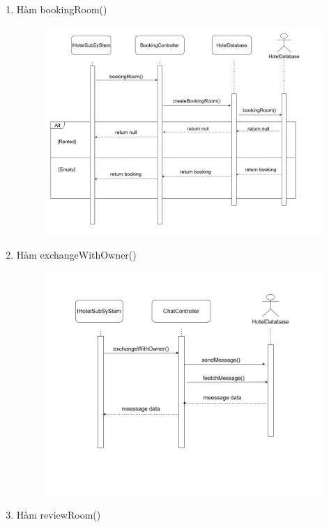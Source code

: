 \begin{enumerate}
\begin{figure}[H]
        \end{figure}
        \item Hàm bookingRoom()
        \begin{figure}[H]
        \centering
        \includegraphics[width=0.9\linewidth]{img3.5/hotel/newbookingRoom.png} 
        \end{figure}
        \item Hàm exchangeWithOwner()
        \begin{figure}[H]
        \centering
        \includegraphics[width=0.9\linewidth]{img3.5/hotel/exchangeWithOwner.png} 
        \end{figure}
        \item Hàm reviewRoom()
        \begin{figure}[H]
        \centering

\end{figure}
\end{enumerate}
